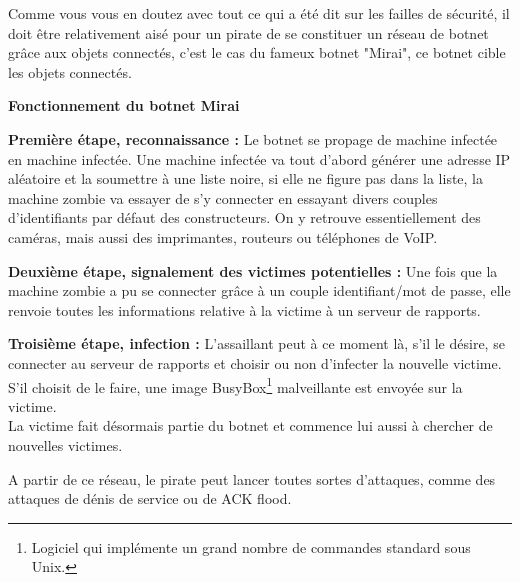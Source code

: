 \documentclass[a4paper]{report}
\begin{document}
	Comme vous vous en doutez avec tout ce qui a été dit sur les failles de sécurité, il doit être relativement aisé pour un pirate
	de se constituer un réseau de botnet grâce aux objets connectés, c'est le cas du fameux botnet "Mirai", ce botnet cible les objets
	connectés.
	
	\bigbreak
	
	\begin{flushleft}
		\textbf{Fonctionnement du botnet Mirai} \\
	\end{flushleft}
	
	\textbf{Première étape, reconnaissance :} Le botnet se propage de machine infectée en machine infectée. Une machine infectée 
	va tout d'abord générer une adresse IP aléatoire et la soumettre à une liste noire, si elle ne figure pas dans la liste, 
	la machine zombie va essayer de s'y connecter en essayant divers couples d'identifiants par défaut des constructeurs. On y retrouve 
	essentiellement des caméras, mais aussi des imprimantes, routeurs ou téléphones de VoIP.
	
	\medbreak

	\textbf{Deuxième étape, signalement des victimes potentielles :} Une fois que la machine zombie a pu se connecter grâce à un couple
	identifiant/mot de passe, elle renvoie toutes les informations relative à la victime à un serveur de rapports.
	
	\medbreak
	
	\textbf{Troisième étape, infection :} L'assaillant peut à ce moment là, s'il le désire, se connecter au serveur de rapports et choisir
	ou non d'infecter la nouvelle victime. S'il choisit de le faire, une image
	BusyBox\footnote{Logiciel qui implémente un grand nombre de commandes standard sous Unix.} malveillante est envoyée sur la victime. \\
	La victime fait désormais partie du botnet et commence lui aussi à chercher de nouvelles victimes.
	
	\medbreak
	A partir de ce réseau, le pirate peut lancer toutes sortes d'attaques, comme des attaques de dénis de service ou de ACK flood.
	
\end{document}
